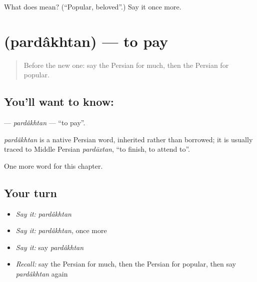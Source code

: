\begin{tcolorbox}[breakable,colback=teal!4,colframe=teal!35!black,title={Before you move on}]
What does  mean? (\textquotedblleft{}Popular, beloved\textquotedblright{}.) Say it once more.
\end{tcolorbox}
\section[\texorpdfstring{\fa{پرداختن} (pardâkhtan)}{پرداختن (pardâkhtan)}]{ (pardâkhtan) — to pay}

\label{lesson:FA-C131-pardakhtan}



\begin{quote}
Before the new one: say the Persian for much, then the Persian for popular.
\end{quote}

\subsection*{You'll want to know: }
\textbf{} — \emph{pardâkhtan} — \textquotedblleft{}to pay\textquotedblright{}.

\begin{cousinweb}
\emph{pardâkhtan} is a native Persian word, inherited rather than borrowed; it is usually traced to Middle Persian \emph{pardāxtan}, \textquotedblleft{}to finish, to attend to\textquotedblright{}.
\end{cousinweb}

\begin{grammarlens}[title={What you've built}]
One more word for this chapter.
\end{grammarlens}

\subsection*{Your turn}
\begin{itemize}
\raggedright
  \item \emph{Say it:} \emph{pardâkhtan}
  \item \emph{Say it:} \emph{pardâkhtan}, once more
  \item \emph{Say it:} say \emph{pardâkhtan}
  \item \emph{Recall:} say the Persian for much, then the Persian for popular, then say \emph{pardâkhtan} again
\end{itemize}


